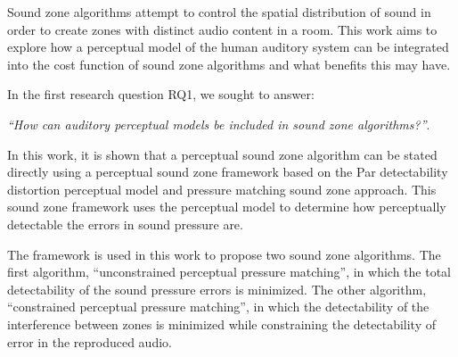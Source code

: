 Sound zone algorithms attempt to control the spatial distribution of sound 
in order to create zones with distinct audio content in a room.
This work aims to explore how a perceptual model of the human auditory system can be integrated into the cost function of sound zone algorithms and what benefits this may have.

In the first research question RQ1, we sought to answer:
\begin{center}
    {\textit{``How can auditory perceptual models be included in sound zone algorithms?''}}.\\
\end{center}
In this work, it is shown that a perceptual sound zone algorithm can be stated directly using a perceptual sound zone framework based on the Par detectability distortion perceptual model and pressure matching sound zone approach.
This sound zone framework uses the perceptual model to determine how perceptually detectable the errors in sound pressure are.

The framework is used in this work to propose two sound zone algorithms.
The first algorithm, ``unconstrained perceptual pressure matching'', 
in which the total detectability of the sound pressure errors is minimized.
The other algorithm, ``constrained perceptual pressure matching'', in which the
detectability of the interference between zones is minimized while constraining the detectability of error in the reproduced audio.

